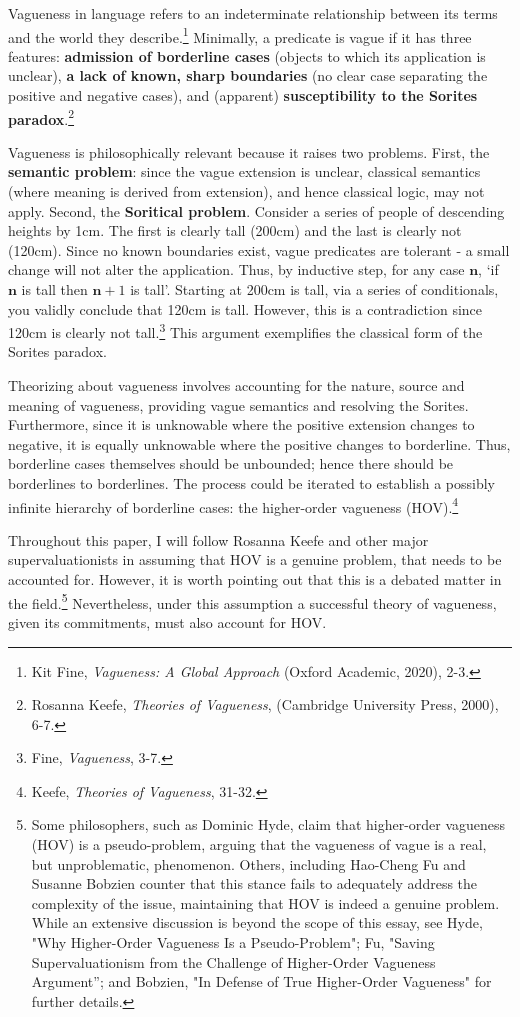 Vagueness in language refers to an indeterminate relationship between
its terms and the world they describe.\footnote{Kit Fine,
  \emph{Vagueness: A Global Approach} (Oxford Academic, 2020), 2-3.} Minimally,
a predicate is vague if it has three features: \textbf{admission of
borderline cases} (objects to which its application is unclear),
\textbf{a lack of known, sharp boundaries} (no clear case separating the
positive and negative cases), and (apparent) \textbf{susceptibility to
the Sorites paradox}.\footnote{Rosanna Keefe, \emph{Theories of
  Vagueness}, (Cambridge University Press, 2000), 6-7.}

Vagueness is philosophically relevant because it raises two problems.
First, the \textbf{semantic problem}: since the vague extension is
unclear, classical semantics (where meaning is derived from extension),
and hence classical logic, may not apply. Second, the \textbf{Soritical
problem}. Consider a series of people of descending heights by 1cm. The
first is clearly tall (200cm) and the last is clearly not (120cm). Since
no known boundaries exist, vague predicates are tolerant - a small
change will not alter the application. Thus, by inductive step, for any
case $\mathbf{n}$, `if $\mathbf{n}$ is tall then $\mathbf{n}+1$ is tall'.
Starting at 200cm is tall, via a series of conditionals, you validly
conclude that 120cm is tall. However, this is a contradiction since
120cm is clearly not tall.\footnote{Fine, \emph{Vagueness}, 3-7.} This
argument exemplifies the classical form of the Sorites paradox.

Theorizing about vagueness involves accounting for the nature, source
and meaning of vagueness, providing vague semantics and resolving the
Sorites. Furthermore, since it is unknowable where the positive
extension changes to negative, it is equally unknowable where the
positive changes to borderline. Thus, borderline cases themselves should
be unbounded; hence there should be borderlines to borderlines. The
process could be iterated to establish a possibly infinite hierarchy of
borderline cases: the higher-order vagueness (HOV).\footnote{Keefe,
  \emph{Theories of Vagueness}, 31-32.}

Throughout this paper, I will follow Rosanna Keefe and other major
supervaluationists in assuming that HOV is a genuine problem, that needs
to be accounted for. However, it is worth pointing out that this is a
debated matter in the field.\footnote{Some philosophers, such as Dominic
  Hyde, claim that higher-order vagueness (HOV) is a pseudo-problem,
  arguing that the vagueness of vague is a real, but unproblematic,
  phenomenon. Others, including Hao-Cheng Fu and Susanne Bobzien counter
  that this stance fails to adequately address the complexity of the
  issue, maintaining that HOV is indeed a genuine problem. While an
  extensive discussion is beyond the scope of this essay, see Hyde, "Why
  Higher-Order Vagueness Is a Pseudo-Problem"; Fu, "Saving
  Supervaluationism from the Challenge of Higher-Order Vagueness
  Argument''; and Bobzien, "In Defense of True Higher-Order Vagueness"
  for further details.} Nevertheless, under this assumption a successful
theory of vagueness, given its commitments, must also account for HOV.

